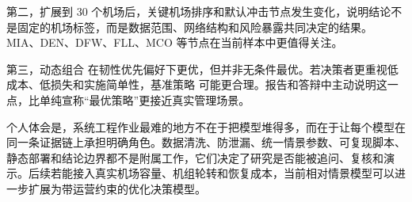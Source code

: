 \documentclass[UTF8,zihao=-4]{ctexart}
\begin{document}
第二，扩展到 30 个机场后，关键机场排序和默认冲击节点发生变化，说明结论不是固定的机场标签，而是数据范围、网络结构和风险暴露共同决定的结果。MIA、DEN、DFW、FLL、MCO 等节点在当前样本中更值得关注。

第三，动态组合 在韧性优先偏好下更优，但并非无条件最优。若决策者更重视低成本、低损失和实施简单性，基准策略 可能更合理。报告和答辩中主动说明这一点，比单纯宣称“最优策略”更接近真实管理场景。

个人体会是，系统工程作业最难的地方不在于把模型堆得多，而在于让每个模型在同一条证据链上承担明确角色。数据清洗、防泄漏、统一情景参数、可复现脚本、静态部署和结论边界都不是附属工作，它们决定了研究是否能被追问、复核和演示。后续若能接入真实机场容量、机组轮转和恢复成本，当前相对情景模型可以进一步扩展为带运营约束的优化决策模型。
\end{document}
